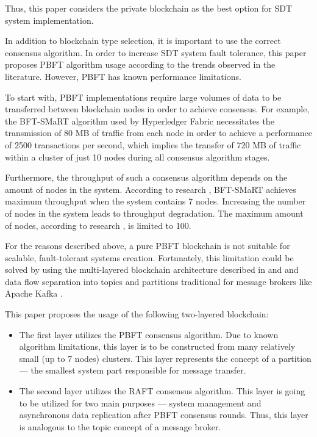 \documentclass[10pt]{llncs}
\begin{document}
Thus, this paper considers the private blockchain as the best option for SDT system implementation.

In addition to blockchain type selection, it is important to use the correct consensus algorithm.
In order to increase SDT system fault tolerance, this paper proposes PBFT algorithm usage according to the trends observed in the literature.
However, PBFT has known performance limitations.

To start with, PBFT implementations require large volumes of data to be transferred between blockchain nodes in order to achieve consensus.
For example, the BFT-SMaRT algorithm used by Hyperledger Fabric \cite{barger2021byzantine} necessitates the transmission of 80 MB of traffic from each node 
in order to achieve a performance of 2500 transactions per second, which implies the transfer of 720 MB of traffic within a cluster of just 10 nodes during all consensus algorithm stages.

Furthermore, the throughput of such a consensus algorithm depends on the amount of nodes in the system.
According to research \cite{barger2021byzantine}, BFT-SMaRT achieves maximum throughput when the system contains 7 nodes.
Increasing the number of nodes in the system leads to throughput degradation.
The maximum amount of nodes, according to research \cite{Ke2023}, is limited to 100.

For the reasons described above, a pure PBFT blockchain is not suitable for scalable, fault-tolerant systems creation.
Fortunately, this limitation could be solved by using the multi-layered blockchain architecture described in \cite{Bogdanov2024} and \cite{Lin2023} and 
data flow separation into topics and partitions traditional for message brokers like Apache Kafka \cite{apachekafka}.

This paper proposes the usage of the following two-layered blockchain:
\begin{itemize}
    \item The first layer utilizes the PBFT consensus algorithm.
    Due to known algorithm limitations, this layer is to be constructed from many relatively small (up to 7 nodes) clusters.
    This layer represents the concept of a partition --- the smallest system part responsible for message transfer.
    \item The second layer utilizes the RAFT \cite{ongaro2015raft} consensus algorithm.
    This layer is going to be utilized for two main purposes --- system management and asynchronous data replication after PBFT consensus rounds.
    Thus, this layer is analogous to the topic concept of a message broker.
\end{itemize}
\end{document}
